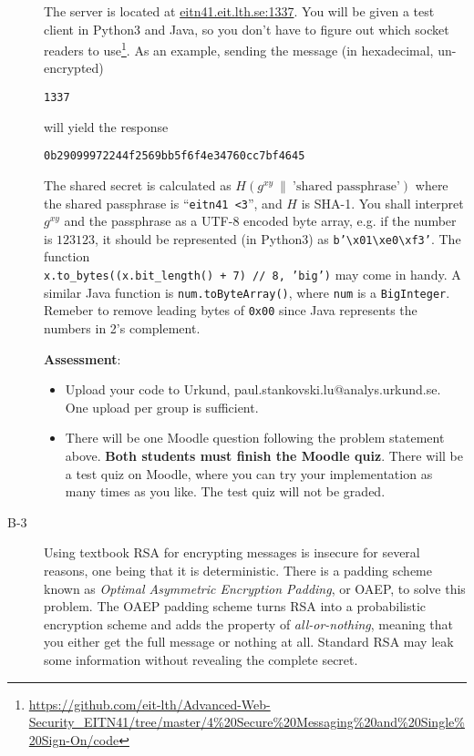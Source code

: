 \documentclass{article}
\begin{document}
\begin{description}
{    \clearpage

	The server is located at \url{eitn41.eit.lth.se:1337}. You will be given a test client in Python3 and Java, so
	you don't have to figure out which socket readers to use\footnote{\url{https://github.com/eit-lth/Advanced-Web-Security_EITN41/tree/master/4\%20Secure\%20Messaging\%20and\%20Single\%20Sign-On/code}}. 
	As an example, sending the message (in hexadecimal, un-encrypted)
    \begin{center}
    \texttt{1337}
    \end{center}
    will yield the response
    \begin{center}
    \texttt{0b29099972244f2569bb5f6f4e34760cc7bf4645}
    \end{center}
    
    The shared secret is calculated as
    $H(g^{xy} ~\| ~\textrm{'shared passphrase'})$
    where the shared passphrase is ``\texttt{eitn41~<3}'', and $H$ is SHA-1. 
    You shall interpret $g^{xy}$ and the passphrase as a UTF-8 encoded byte array, e.g. if the number is $123123$,
    it should be represented (in Python3) as \texttt{b'\textbackslash x01\textbackslash xe0\textbackslash xf3'}. 
    The function \\
    \texttt{x.to\_bytes((x.bit\_length() + 7) // 8, 'big')} may come in handy. A similar Java function is
    \texttt{num.toByteArray()}, where \texttt{num} is a \texttt{BigInteger}. Remeber to remove leading bytes of 
    \texttt{0x00} since Java represents the numbers in 2's complement.

	\textbf{Assessment}:
	\begin{itemize}
		\item Upload your code to Urkund, paul.stankovski.lu@analys.urkund.se.
        One upload per group is sufficient.
        
		\item There will be one Moodle question following the problem statement above. 
        \textbf{Both students must finish the Moodle quiz}.
        There will be a test quiz on Moodle, where you can try your implementation as many times as you like. 
        The test quiz will not be graded.
	\end{itemize}
    }

	\item[B-3]{Using textbook RSA for encrypting messages is insecure for several reasons, one being that it
    is deterministic. There is a padding scheme known as \emph{Optimal Asymmetric Encryption Padding}, or OAEP, to solve
    this problem. The OAEP padding scheme turns RSA into a probabilistic encryption scheme and adds the property
    of \emph{all-or-nothing}, meaning that you either get the full message or nothing at all. Standard RSA may leak some
    information without revealing the complete secret.
    
}
\end{description}
\end{document}
